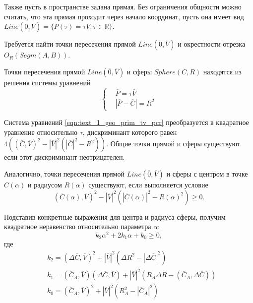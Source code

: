 Также пусть в пространстве задана прямая.
Без ограничения общности можно считать, что эта прямая проходит через начало координат, пусть она имеет вид $Line(\overline{0}, \overline{V}) = \{ \overline{P}(\tau) = \tau \overline{V}: \tau \in \mathbb{R} \}$.

Требуется найти точки пересечения прямой $Line(\overline{0}, \overline{V})$ и окрестности отрезка $O_R(Segm(A, B))$.

Точки пересечения прямой $Line(\overline{0}, \overline{V})$ и сферы $Sphere(C, R)$ находятся из решения системы уравнений
\begin{equation}\label{eqn:text_1_geo_prim_tv_pcr}
	\left\{
		\begin{aligned}
			& \overline{P} = \tau \overline{V} \\
			& |\overline{P} - \overline{C}| = R^2
		\end{aligned}
	\right.
\end{equation}

Система уравнений \eqref{eqn:text_1_geo_prim_tv_pcr} преобразуется в квадратное уравнение относительно $\tau$, дискриминант которого равен $4\left((\overline{C}, \overline{V})^2 - |\overline{V}|^2 \left(|\overline{C}|^2 - R^2\right)\right)$.
Общие точки прямой и сферы существуют если этот дискриминант неотрицателен.

Аналогично, точки пересечения прямой $Line(\overline{0}, \overline{V})$ и сферы с центром в точке $C(\alpha)$ и радиусом $R(\alpha)$ существуют, если выполняется условие
\begin{equation}
	(\overline{C}(\alpha), \overline{V})^2 - |\overline{V}|^2 \left(|\overline{C}(\alpha)|^2 - R(\alpha)^2\right) \ge 0.
\end{equation}

Подставив конкретные выражения для центра и радиуса сферы, получим квадратное неравенство относительно параметра $\alpha$:
\begin{equation}\label{eqn:text_1_geo_prim_ineq_k2k1k0}
	k_2 \alpha^2 + 2 k_1 \alpha + k_0 \ge 0,
\end{equation}
где
\begin{equation}\label{eqn:text_1_geo_prim_k2k1k0}
	\begin{aligned}
		& k_2 = (\Delta \overline{C}, \overline{V})^2 + |\overline{V}|^2 \left( \Delta R^2 - |\Delta \overline{C}|^2 \right) \\
		& k_1 = (\overline{C}_A, \overline{V})(\Delta \overline{C}, \overline{V}) + |\overline{V}|^2 \left(R_A \Delta R - (\overline{C}_A, \Delta \overline{C}) \right) \\
		& k_0 = (\overline{C}_A, \overline{V})^2 + |\overline{V}|^2 \left( R_A^2 - |\overline{C}_A|^2 \right)
	\end{aligned}
\end{equation}

